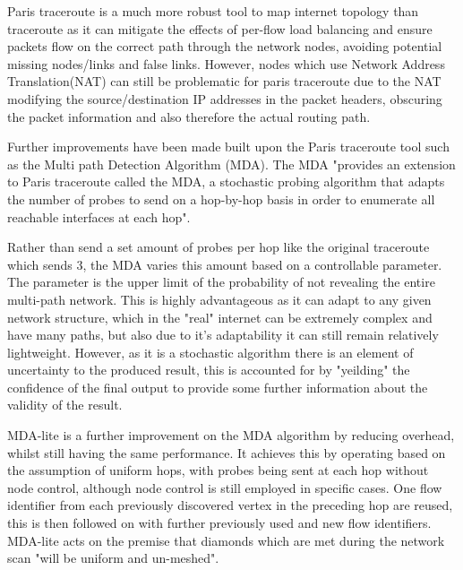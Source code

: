 Paris traceroute is a much more robust tool to map internet topology than traceroute as it can mitigate the effects of per-flow load balancing and ensure packets flow on the correct path through the network nodes, avoiding potential missing nodes/links and false links. However, nodes which use Network Address Translation(NAT) can still be problematic for paris traceroute due to the NAT modifying the source/destination IP addresses in the packet headers, obscuring the packet information and also therefore the actual routing path. \cite{anomalies}

Further improvements have been made built upon the Paris traceroute tool such as the Multi path Detection Algorithm (MDA). The MDA "provides an extension to Paris traceroute called the MDA, a stochastic probing algorithm that adapts the number of
probes to send on a hop-by-hop basis in order to enumerate all reachable interfaces at each hop". \cite{MDA2}

Rather than send a set amount of probes per hop like the original traceroute which sends 3, the MDA varies this amount based on a controllable parameter. \cite{MDA2} The parameter is the upper limit of the probability of not revealing the entire multi-path network. This is highly advantageous as it can adapt to any given network structure, which in the "real" internet can be extremely complex and have many paths, but also due to it's adaptability it can still remain relatively lightweight. However, as it is a stochastic algorithm there is an element of uncertainty to the produced result, this is accounted for by "yeilding" the  confidence of the final output to provide some further information about the validity of the result. \cite{MDA-lite}\cite{diamond-miner}\cite{MDA3}



MDA-lite is a further improvement on the MDA algorithm by reducing overhead, whilst still having the same performance. It achieves this by operating based on the assumption of uniform hops, with probes being sent at each hop without node control, although node control is still employed in specific cases. One flow identifier from each previously discovered vertex in the preceding hop are reused, this is then followed on with further previously used and new flow identifiers. MDA-lite acts on the premise that diamonds which are met during the network scan "will be uniform and un-meshed". \cite{MDA-lite} 

